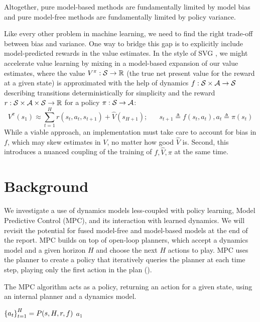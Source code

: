 \documentclass{article}
\let\Oldsection\section
\renewcommand{\section}{\FloatBarrier\Oldsection}
\begin{document}
Altogether, pure model-based methods are fundamentally limited by model bias and pure model-free methods are fundamentally limited by policy variance.

Like every other problem in machine learning, we need to find the right trade-off between bias and variance. One way to bridge this gap is to explicitly include model-predicted rewards in the value estimates. In the style of SVG \cite{heess2015learning}, we might accelerate value learning by mixing in a model-based expansion of our value estimates, where the value $V^\pi:\mathcal{S}\rightarrow \mathbb{R}$ (the true net present value for the reward at a given state) is approximated with the help of dynamics $f:\mathcal{S}\times \mathcal{A}\rightarrow \mathcal{S}$ describing transitions deterministically for simplicity and the reward $r:\mathcal{S}\times\mathcal{A}\times\mathcal{S}\rightarrow\mathbb{R}$ for a policy $\pi:\mathcal{S}\rightarrow \mathcal{A}$:
$$
V^\pi(s_1)\approx\sum_{t=1}^Hr(s_t,a_t,s_{t+1})+\hat V(s_{H+1});\;\;\;\;\;\; s_{t+1}\triangleq f(s_t, a_t),a_t\triangleq \pi(s_t)
$$
While a viable approach, an implementation must take care to account for bias in $f$, which may skew estimates in $V$, no matter how good $\hat V$ is. Second, this introduces a nuanced coupling of the training of $f,\hat V,\pi$ at the same time.

\section{Background}

We investigate a use of dynamics models less-coupled with policy learning, Model Predictive Control (MPC), and its interaction with learned dynamics. We will revisit the potential for fused model-free and model-based models at the end of the report. MPC builds on top of open-loop planners, which accept a dynamics model and a given horizon $H$ and choose the next $H$ actions to play. MPC uses the planner to create a policy that iteratively queries the planner at each time step, playing only the first action in the plan ().

\begin{algorithm}
\caption{The \textsc{MPC} algorithm acts as a policy, returning an action for a given state, using an internal planner and a dynamics model.} \label{alg:mpc}
\begin{algorithmic}[1]
\State $\left\{{a_t}\right\}_{t=1}^H=P(s, H, r, f)$
\State\Return $a_1$
\EndProcedure
\end{algorithmic}
\end{algorithm}
\end{document}
